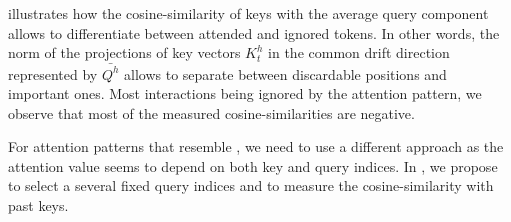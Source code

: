  illustrates how the cosine-similarity of keys with the average query component allows to differentiate between attended and ignored tokens. In other words, the norm of the projections of key vectors $K^h_t$ in the common drift direction represented by $\bar{Q^h}$ allows to separate between discardable positions and important ones. Most interactions being ignored by the attention pattern, we observe that most of the measured cosine-similarities are negative.

For attention patterns that resemble , we need to use a different approach as the attention value seems to depend on both key and query indices. In , we propose to select a several fixed query indices and to measure the cosine-similarity with past keys.

